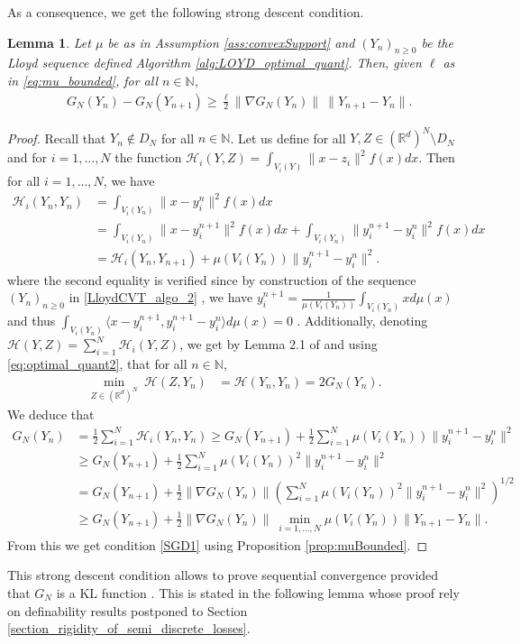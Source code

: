 \documentclass[11pt]{article}
\newcommand{\N}{\mathbb N}
\newcommand{\R}{\mathbb R}
\newcommand{\HH}{\mathcal H}
\newcommand{\1}{\mathbbm{1}}
\newtheorem{lem}{Lemma}[section]
\numberwithin{equation}{section}
\begin{document}
As a consequence, we get the following strong descent condition.
\begin{lem}\label{SGD_LloydCVT}
	Let $\mu$ be as in Assumption \ref{ass:convexSupport} and $(Y_{n})_{n\geq 0}$ be the Lloyd sequence defined Algorithm \ref{alg:LOYD_optimal_quant}. Then, given $\ell$ as in \eqref{eq:mu_bounded}, for all $n \in \N$, 
	\begin{align}
		&G_N(Y_n)-G_N(Y_{n+1})\geq \frac{\ell}{2} \|\nabla G_N(Y_{n})\|  \ \|Y_{n+1}-Y_{n}\|. \label{SGD1} \tag{SDC}
	\end{align}
\end{lem}

\begin{proof}
	Recall that $Y_n \not \in D_N$ for all $n \in \N$.
	Let us define for all $Y,Z\in(\R^d)^N \setminus D_N$ and for $i=1,\ldots,N$ the function $\mathcal{H}_{i}(Y,Z)=\int_{V_{i}(Y)}\|x-z_{i}\|^{2}f(x)dx$. Then for all $i=1, \ldots, N$, we have
	\begin{align*}
            \mathcal{H}_{i}(Y_{n},Y_{n})&=\int_{V_{i}(Y_{n})}\|x-y^{n}_{i}\|^{2}f(x)dx\\
            &=\int_{V_{i}(Y_{n})}\|x-y_{i}^{n+1}\|^{2}f(x)dx + \int_{V_{i}(Y_{n})}\|y_{i}^{n+1}-y_{i}^{n}\|^{2}f(x)dx\\
            &=\mathcal{H}_{i}(Y_{n},Y_{n+1})+\mu(V_{i}(Y_{n}))\|y_{i}^{n+1}-y_{i}^{n}\|^{2}.
    \end{align*}
where the second equality is verified since by construction of the sequence $(Y_{n})_{n\geq 0}$ in \eqref{LloydCVT_algo_2} , we have $y_i^{n+1}=\frac{1}{\mu(V_i(Y_n))}\int_{V_i(Y_n)}xd\mu(x)$ and thus $\int_{V_{i}(Y_{n})}\langle x-y_{i}^{n+1},y_{i}^{n+1}-y_{i}^{n} \rangle d\mu(x)=0$ .  
	Additionally, denoting $\HH(Y,Z) = \sum_{i=1}^N \HH_i(Y,Z)$, we get by Lemma 2.1 of \cite{LloydCVT} and using \eqref{eq:optimal_quant2}, that for all $n \in \N$,
	\begin{align*}
		\min_{Z\in(\R^d)^N}\ \HH(Z,Y_{n})&=\HH(Y_{n},Y_{n}) = 2G_N(Y_{n}). 
	\end{align*}
	We deduce that
    \begin{align}
		G_{N}(Y_{n})& = \frac{1}{2} \sum_{i=1}^N \mathcal{H}_{i}(Y_{n},Y_{n})\geq G_{N}(Y_{n+1})+ \frac{1}{2}\sum_{i=1}^{N}\mu(V_{i}(Y_{n}))\|y_{i}^{n+1}-y_{i}^{n}\|^{2}\label{SGD_LLoyd2}\\
        &\geq G_{N}(Y_{n+1})+\frac{1}{2}\sum_{i=1}^{N}\mu(V_{i}(Y_{n}))^{2}\|y_{i}^{n+1}-y_{i}^{n}\|^{2}\nonumber\\
        &=G_{N}(Y_{n+1})+\frac{1}{2}\|\nabla G_{N}(Y_{n})\|\left(\sum_{i=1}^{N}\mu(V_{i}(Y_{n}))^{2}\|y_{i}^{n+1}-y_{i}^{n}\|^{2}\right)^{1/2}\nonumber\\
        &\geq G_{N}(Y_{n+1})+\frac{1}{2}\|\nabla G_{N}(Y_{n})\|\ \min_{i=1,\ldots,N}\mu(V_{i}(Y_{n}))\|Y_{n+1}-Y_{n}\|\nonumber. 
    \end{align}
	From this we get condition \eqref{SGD1} using Proposition \ref{prop:muBounded}.
\end{proof}
This strong descent condition allows to prove sequential convergence provided that $G_N$ is a KL function \cite{AbsMahAnd2005}. This is stated in the following lemma whose proof rely on definability results postponed to Section \ref{section_rigidity_of_semi_discrete_losses}.
\end{document}
